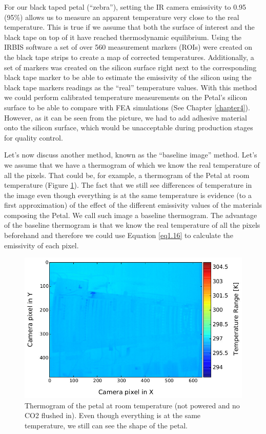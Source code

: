 		For our black taped petal (“zebra”), setting the IR camera emissivity to 0.95 (95\%) allows us to measure an apparent temperature very close to the real temperature. This is true if we assume that both the surface of interest and the black tape on top of it have reached thermodynamic equilibrium. Using the IRBIS software a set of over 560 measurement markers (ROIs) were created on the black tape strips to create a map of corrected temperatures. Additionally, a set of markers was created on the silicon surface right next to the corresponding black tape marker to be able to estimate the emissivity of the silicon using the black tape markers readings as the “real” temperature values. With this method we could perform calibrated temperature measurements on the Petal’s silicon surface to be able to compare with FEA simulations (See Chapter \ref{chapter4}). However, as it can be seen from the picture, we had to add adhesive material onto the silicon surface, which would be unacceptable during production stages for quality control. 
		
		Let’s now discuss another method, known as the “baseline image” method. Let's we assume that we have a thermogram of which we know the real temperature of all the pixels. That could be, for example, a thermogram of the Petal at room temperature (Figure \ref{fig3.3}). The fact that we still see differences of temperature in the image even though everything is at the same temperature is evidence (to a first approximation) of the effect of the different emissivity values of the materials composing the Petal. We call such image a baseline thermogram. The advantage of the baseline thermogram is that we know the real temperature of all the pixels beforehand and therefore we could use Equation \ref{eq1.16} to calculate the emissivity of each pixel. 
	
		\begin{figure}[ht!]
			\centering
			\captionsetup{justification=centering,margin=2cm}
			\includegraphics[scale=0.55]{Figures/Chapter03/thermo_Temp_201708091701_avg.jpg}
			\caption{Thermogram of the petal at room temperature (not powered and no CO2 flushed in). Even though everything is at the same temperature, we still can see the shape of the petal.}\label{fig3.3}
		\end{figure}
	
